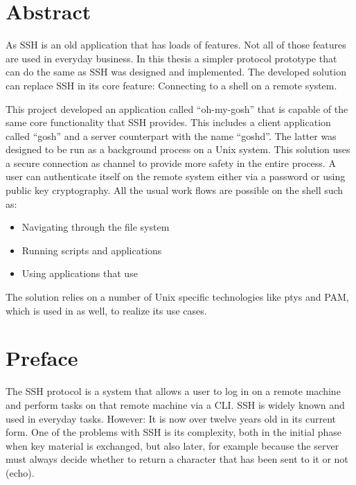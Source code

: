 \documentclass[10pt,a4paper,titlepage,twoside,english,final]{zhawreprt}
\begin{document}
\maketitle

\chapter*{Abstract}\label{sec:Abstract}
As \gls{SSH} is an old application that has loads of features.
Not all of those features are used in everyday business.
In this thesis a simpler protocol prototype that can do the same as \gls{SSH} was designed and implemented.
The developed solution can replace \gls{SSH} in its core feature:
Connecting to a \gls{shell} on a remote system.

This project developed an application called ``oh-my-gosh'' that is capable of the same core functionality that \gls{SSH} provides. This includes a client application called ``gosh'' and a server counterpart with the name ``goshd''.
The latter was designed to be run as a background process on a \gls{Unix} system.
This solution uses a secure connection as channel to provide more safety in the entire process.
A user can authenticate itself on the remote system either via a password or using public key cryptography.
All the usual work flows are possible on the \gls{shell} such as:

\begin{itemize}
\item Navigating through the file system
\item Running scripts and applications
\item Using applications that use \cite{ncurses}
\end{itemize}

The solution relies on a number of \gls{Unix} specific technologies like \glspl{pty} and \gls{PAM}, which is used in \cite{login} as well, to realize its use cases.



\chapter*{Preface}\label{sec:Preface}
The \gls{SSH} protocol \citep{rfc253,rfc6668,rfc8268,rfc8308,rfc8332} is a system that allows a user to log in on a remote machine and perform tasks on that remote machine via a \gls{CLI}.
\gls{SSH} is widely known and used in everyday tasks.
However: It is now over twelve years old in its current form.
One of the problems with \gls{SSH} is its complexity, both in the initial phase when key material is exchanged, but also later, for example because the server must always decide whether to return a character that has been sent to it or not (echo).
\end{document}
